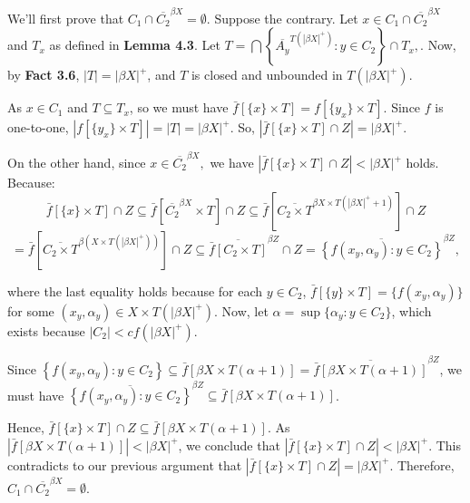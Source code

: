 \documentclass{article}
\begin{document}
\vskip 15pt
We'll first prove that $C_1\cap \overline{C_2}^{\beta X}=\emptyset$. 
Suppose the contrary. Let $x\in C_1\cap \overline{C_2}^{\beta X}$ and $T_x$ as defined in \textbf{Lemma 4.3}. 
Let $T=\bigcap \left\{ \overline{A_y}^{T(|\beta X|^+)} : y\in C_2 \right\}  \cap T_x,$. Now, by \textbf{Fact 3.6}, $|T|=\left|\beta X\right|^+ $, and $T$ is closed and unbounded in $T(\left|\beta X \right| ^+)$. \\

\vskip 10pt

As $x\in C_1$ and $T\subseteq T_x$, so we must have $\bar{f}\left[\{x\} \times T \right] = f\left[\{y_x\}\times T\right].$ Since $f$ is one-to-one, $\left|f\left[\{y_x\}\times T\right]\right|=|T|=\left|\beta X \right| ^+$. So, $\left|\bar{f}\left[\{x\}\times T\right]\cap Z\right|=|\beta X|^+.$

\vskip 5pt
On the other hand, since $x\in \overline{C_2}^{\beta X},$ we have $\left|\bar{f}\left[\{x\} \times T \right] \cap Z \right| < \left|\beta X \right|^+$ holds. Because: \\
$$\bar{f}\left[\{x\}\times T\right] \cap Z 
\subseteq \bar{f}\left[\overline{C_2}^{\beta X} \times T\right] \cap Z 
\subseteq \bar{f}\left[\overline{C_2\times T}^{\beta X \times T(|\beta X|^+ +1)}\right] \cap Z$$
$$=\bar{f}\left[\overline{C_2\times T}^{\beta \left(X \times T(|\beta X|^+ )\right)}\right] \cap Z
\subseteq \overline{\bar{f}\left[C_2\times T\right]}^{\beta Z} \cap Z
=\overline{    \left\{ f(x_y,\alpha_y): y\in C_2 \right\}        }^{\beta Z},$$

where the last equality holds because for each $y\in C_2$, $\bar{f}\left[\{y\}\times T \right]=\{f(x_y,\alpha_y)\}$ for some $(x_y,\alpha_y)\in X\times T(|\beta X|^+).$ Now, let $\alpha=\sup\{\alpha_y: y\in C_2\}$, which exists because $|C_2|< cf\left( \left|\beta X\right|^+ \right)$. 

Since $\left\{ f(x_y,\alpha_y): y\in C_2 \right\} 
\subseteq \bar{f}\left[\beta X \times T(\alpha +1) \right] = \overline{ \bar{f}\left[\beta X \times T(\alpha +1) \right]}^{\beta Z}$, we must have $\overline{    \left\{ f(x_y,\alpha_y): y\in C_2 \right\}        }^{\beta Z} \subseteq \bar{f}\left[\beta X \times T(\alpha +1) \right] $. 

Hence, $\bar{f}\left[\{x\}\times T\right] \cap Z \subseteq \bar{f}\left[\beta X \times T(\alpha +1) \right].$ 
As $\left| \bar{f}\left[\beta X \times T(\alpha +1) \right] \right| < |\beta X |^+$, we conclude that 
$\left|\bar{f}\left[\{x\} \times T \right] \cap Z \right| < \left|\beta X \right|^+$. This contradicts to our 
previous argument that $ \left|\bar{f}\left[\{x\} \times T \right] \cap Z \right| = \left|\beta X \right|^+$. Therefore, 
$C_1\cap \overline{C_2}^{\beta X}=\emptyset$. 
\end{document}
